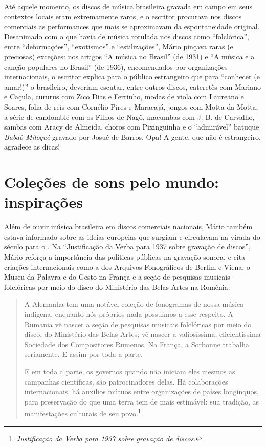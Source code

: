 Até aquele momento, os discos de música brasileira gravada em campo em
seus contextos locais eram extremamente raros, e o escritor procurava
nos discos comerciais as performances que mais se aproximavam da
espontaneidade original. Desanimado com o que havia de música rotulada
nos discos como ``folclórica'', entre ``deformações'', ``exotismos'' e
``estilizações'', Mário pinçava raras (e preciosas) exceções: nos
artigos ``A música no Brasil'' (de 1931) e ``A música e a canção
populares no Brasil'' (de 1936), encomendados por organizações
internacionais, o escritor explica para o público estrangeiro que para
``conhecer (e amar!)'' o brasileiro, deveriam escutar, entre outros
discos, cateretês com Mariano e Caçula, cururus com Zico Dias e
Ferrinho, modas de viola com Laureano e Soares, folia de reis com
Cornélio Pires e Maracajá, jongos com Motta da Motta, a série de
candomblé com os Filhos de Nagô, macumbas com J. B. de Carvalho, sambas
com Aracy de Almeida, choros com Pixinguinha e o ``admirável'' batuque
\emph{Babaô Miloquê} gravado por Josué de Barros. Opa! A gente, que não
é estrangeiro, agradece as dicas!

\section{Coleções de sons pelo mundo: inspirações}

Além de ouvir música brasileira em discos comerciais nacionais, Mário
também estava informado sobre as ideias europeias que surgiam e
circulavam na virada do século  para o . Na ``Justificação da Verba
para 1937 sobre gravação de discos'', Mário reforça a importância das
políticas públicas na gravação sonora, e cita criações internacionais
como a dos Arquivos Fonográficos de Berlim e Viena, o Museu da Palavra e
do Gesto na França e a seção de pesquisas musicais folclóricas por meio
do disco do Ministério das Belas Artes na Romênia:

\begin{quote}
A Alemanha tem uma notável coleção de fonogramas de nossa música
indígena, enquanto nós próprios nada possuímos a esse respeito. A
Rumania vê nascer a seção de pesquisas musicais folclóricas por meio do
disco, do Ministério das Belas Artes; vê nascer a valiosíssima,
eficientíssima Sociedade dos Compositores Rumenos. Na França, a Sorbonne
trabalha seriamente. E assim por toda a parte.

E em toda a parte, os governos quando não iniciam eles mesmos as
campanhas científicas, são patrocinadores delas. Há colaborações
internacionais, há auxílios mútuos entre organizações de países
longínquos, para preservação do que uma terra tem de mais estimável: sua
tradição, as manifestações culturais de seu povo.\footnote{\emph{Justificação
  da Verba para 1937 sobre gravação de discos.}}
\end{quote}


